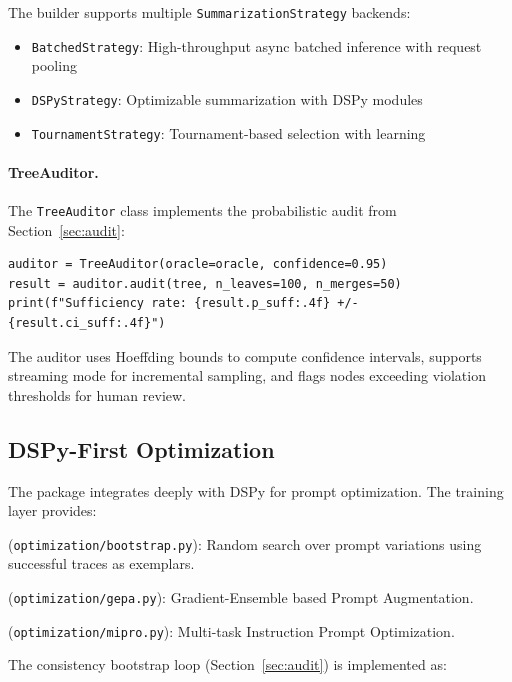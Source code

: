 The builder supports multiple \texttt{SummarizationStrategy} backends:
\begin{itemize}[nosep]
    \item \texttt{BatchedStrategy}: High-throughput async batched inference with request pooling
    \item \texttt{DSPyStrategy}: Optimizable summarization with DSPy modules
    \item \texttt{TournamentStrategy}: Tournament-based selection with learning
\end{itemize}

\paragraph{TreeAuditor.}
The \texttt{TreeAuditor} class implements the probabilistic audit from Section~\ref{sec:audit}:

\begin{lstlisting}
auditor = TreeAuditor(oracle=oracle, confidence=0.95)
result = auditor.audit(tree, n_leaves=100, n_merges=50)
print(f"Sufficiency rate: {result.p_suff:.4f} +/- {result.ci_suff:.4f}")
\end{lstlisting}

The auditor uses Hoeffding bounds to compute confidence intervals, supports streaming mode for incremental sampling, and flags nodes exceeding violation thresholds for human review.

\subsection{DSPy-First Optimization}

The package integrates deeply with DSPy \citep{khattab2024dspy} for prompt optimization. The training layer provides:

\begin{description}[nosep]
    \item[Bootstrap Optimizer] (\texttt{optimization/bootstrap.py}): Random search over prompt variations using successful traces as exemplars.
    \item[GEPA] (\texttt{optimization/gepa.py}): Gradient-Ensemble based Prompt Augmentation.
    \item[MIPRO] (\texttt{optimization/mipro.py}): Multi-task Instruction Prompt Optimization.
\end{description}

The consistency bootstrap loop (Section~\ref{sec:audit}) is implemented as:

